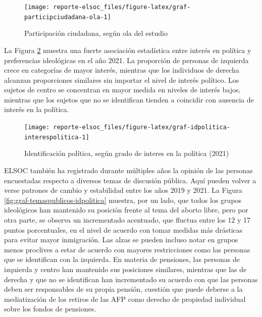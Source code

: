 \documentclass[
  12pt,
]{book}
\begin{document}
\begin{figure}

{\centering \texttt{[image: reporte-elsoc\_files/figure-latex/graf-participciudadana-ola-1]} 

}

\caption{Participación ciudadana, según ola del estudio}\label{fig:graf-participciudadana-ola}
\end{figure}

La Figura \ref{fig:graf-idpolitica-interespolitica} muestra una fuerte asociación estadística entre interés en política y preferencias ideológicas en el año 2021. La proporción de personas de izquierda crece en categorías de mayor interés, mientras que los individuos de derecha alcanzan proporciones similares sin importar el nivel de interés político. Los sujetos de centro se concentran en mayor medida en niveles de interés bajos, mientras que los sujetos que no se identifican tienden a coincidir con ausencia de interés en la política.

\begin{figure}

{\centering \texttt{[image: reporte-elsoc\_files/figure-latex/graf-idpolitica-interespolitica-1]} 

}

\caption{Identificación política, según grado de interes en la política (2021)}\label{fig:graf-idpolitica-interespolitica}
\end{figure}

ELSOC también ha registrado durante múltiples años la opinión de las personas encuestadas respecto a diversos temas de discusión pública. Aquí pueden volver a verse patrones de cambio y estabilidad entre los años 2019 y 2021. La Figura \ref{fig:graf-temaspublicos-idpolitica} muestra, por un lado, que todos los grupos ideológicos han mantenido su posición frente al tema del aborto libre, pero por otra parte, se observa un incrementado acentuado, que fluctua entre los 12 y 17 puntos porcentuales, en el nivel de acuerdo con tomar medidas más drásticas para evitar mayor inmigración. Las alzas se pueden incluso notar en grupos menos proclives a estar de acuerdo con mayores restricciones como las personas que se identifican con la izquierda. En materia de pensiones, las personas de izquierda y centro han mantenido sus posiciones similares, mientras que las de derecha y que no se identifican han incrementado su acuerdo con que las personas deben ser responsables de su propia pensión, cuestión que puede deberse a la mediatización de los retiros de las AFP como derecho de propiedad individual sobre los fondos de pensiones.
\end{document}
